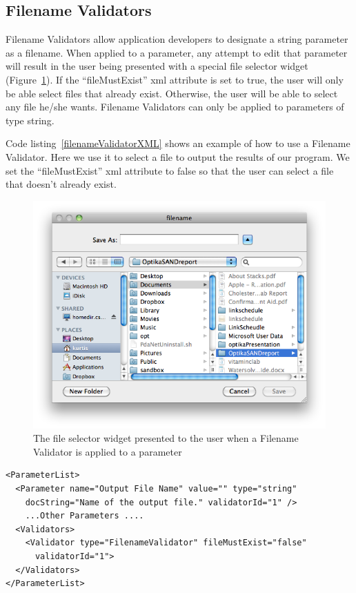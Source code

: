 \subsection{Filename Validators}
Filename Validators allow application developers to designate a string parameter as a filename. When applied to a parameter,
any attempt to edit that parameter will result in the user being presented with a special file selector widget (Figure~\ref{fileSelectorWidget}). If the 
``fileMustExist'' xml attribute is set to true, the user will only be able select files that already exist. Otherwise, the user will be able
to select any file he/she wants. Filename Validators can only be applied to parameters of type string. 

Code listing~\ref{filenameValidatorXML} shows an example of how to use a Filename Validator. Here we use it to select a file to output the results
of our program. We set the ``fileMustExist'' xml attribute to false so that the user can select a file that doesn't already exist.
\begin{figure}
\centering
\includegraphics[scale=0.5]{graphics/fileWidget}
\caption{The file selector widget presented to the user when a Filename Validator is applied to a parameter}
\label{fileSelectorWidget}
\end{figure}
\begin{lstlisting}[caption={Example usage of a Filename Validator}, label=filenameValidatorXML]
<ParameterList>
  <Parameter name="Output File Name" value="" type="string" 
    docString="Name of the output file." validatorId="1" />
    ...Other Parameters ....
  <Validators>
    <Validator type="FilenameValidator" fileMustExist="false" 
      validatorId="1">
  </Validators>
</ParameterList>
\end{lstlisting}

